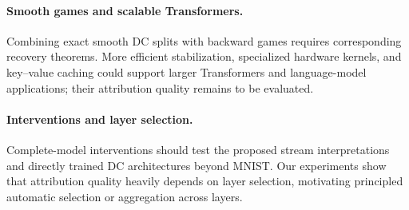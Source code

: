 \paragraph{Smooth games and scalable Transformers.}
Combining exact smooth DC splits with backward games requires corresponding recovery theorems. More efficient stabilization, specialized hardware kernels, and key--value caching could support larger Transformers and language-model applications; their attribution quality remains to be evaluated.

\paragraph{Interventions and layer selection.}
Complete-model interventions should test the proposed stream interpretations and directly trained DC architectures beyond MNIST. Our experiments show that attribution quality heavily depends on layer selection, motivating principled automatic selection or aggregation across layers.
